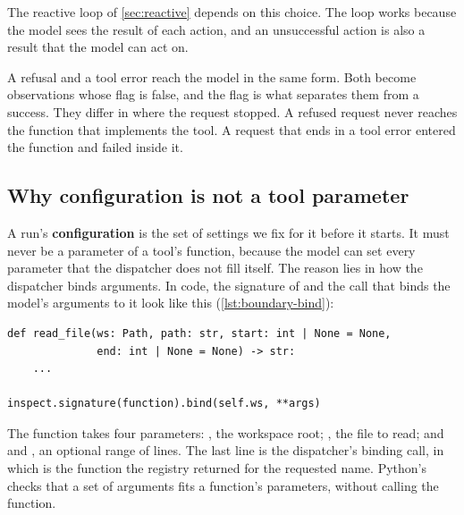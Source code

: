 The reactive loop of \cref{sec:reactive} depends on this choice. The loop works because the model
sees the result of each action, and an unsuccessful action is also a result that the model can act
on.

A refusal and a tool error reach the model in the same form. Both become observations whose
 flag is false, and the flag is what separates them from a success. They differ in where
the request stopped. A refused request never reaches the function that implements the tool. A
request that ends in a tool error entered the function and failed inside it.

\subsection{Why configuration is not a tool parameter}
\label{sec:boundary-config}

A run's \textbf{configuration} is the set of settings we fix for it before it starts. It must never
be a parameter of a tool's function, because the model can set every parameter that the dispatcher
does not fill itself. The reason lies in how the dispatcher binds arguments. In code, the signature
of  and the call that binds the model's arguments to it look like this
(\cref{lst:boundary-bind}):

\noindent\begin{minipage}{\linewidth}%
\begin{lstlisting}[basicstyle=\ttfamily\scriptsize, columns=fullflexible, keepspaces=true, breaklines=false, caption={The signature of \demoref{read\_file}, and the call with which the dispatcher binds the model's arguments to it.}, label=lst:boundary-bind]
def read_file(ws: Path, path: str, start: int | None = None,
              end: int | None = None) -> str:
    ...

inspect.signature(function).bind(self.ws, **args)
\end{lstlisting}
\end{minipage}

The function  takes four parameters: , the workspace root;
, the file to read; and  and , an optional range of lines.
The last line is the dispatcher's binding call, in which  is the function the
registry returned for the requested name. Python's  checks that
a set of arguments fits a function's parameters, without calling the function.

